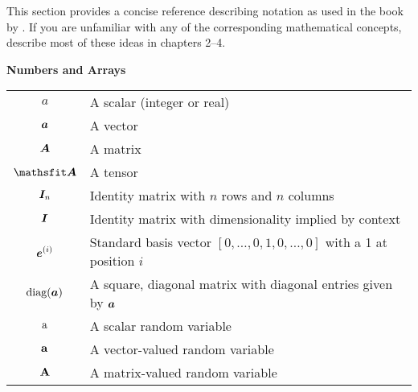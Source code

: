 

This section provides a concise reference describing notation as used in the book by \citet{goodfellow2016deep}.
If you are unfamiliar with any of the corresponding mathematical concepts,
\citet{goodfellow2016deep} describe most of these ideas in
chapters 2--4. \\[0.7cm]

\centerline{\bf Numbers and Arrays}
\bgroup
\def\arraystretch{1.5}
\begin{tabular}{cp{3.25in}}
$\displaystyle a$ & A scalar (integer or real)\\
$\displaystyle {\bm{a}}$ & A vector\\
$\displaystyle {\bm{A}}$ & A matrix\\
$\displaystyle \tA$ & A tensor\\
$\displaystyle {\bm{I}}_n$ & Identity matrix with $n$ rows and $n$ columns\\
$\displaystyle {\bm{I}}$ & Identity matrix with dimensionality implied by context\\
$\displaystyle {\bm{e}}^{(i)}$ & Standard basis vector $[0,\dots,0,1,0,\dots,0]$ with a 1 at position $i$\\
$\displaystyle \text{diag}({\bm{a}})$ & A square, diagonal matrix with diagonal entries given by ${\bm{a}}$\\
$\displaystyle {\textnormal{a}}$ & A scalar random variable\\
$\displaystyle {\mathbf{a}}$ & A vector-valued random variable\\
$\displaystyle {\mathbf{A}}$ & A matrix-valued random variable\\
\end{tabular}

\clearpage
